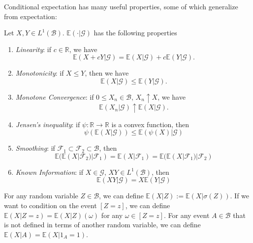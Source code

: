 Conditional expectation has many useful properties, some of which generalize from expectation:
\begin{proposition}
    \label{cexpe_properties}
    Let \(X, Y \in L^{1}(\mathcal{B})\). \(\mathbb{E}(\cdot|{\mathcal{G}})\) has the following properties
    \begin{enumerate}
        \item \textit{Linearity}: if \(c \in \mathbb{R}\), we have \[\mathbb{E}(X + cY|{\mathcal{G}}) = \mathbb{E}(X|{\mathcal{G}}) + c\mathbb{E}(Y|{\mathcal{G}}).\]
        \item \textit{Monotonicity}: if \(X \leq Y\), then we have \[\mathbb{E}(X|{\mathcal{G}}) \leq \mathbb{E}(Y|{\mathcal{G}}).\]
        \item \textit{Monotone Convergence}: if \(0 \leq X_{n} \in \mathcal{B}\), \(X_{n} \uparrow X\), we have \[\mathbb{E}(X_{n}|{\mathcal{G}}) \uparrow \mathbb{E}(X|{\mathcal{G}}).\]
        \item \textit{Jensen's inequality}: if \(\psi: \mathbb{R} \to \mathbb{R}\) is a convex function, then \[\psi(\mathbb{E}(X|{\mathcal{G}})) \leq \mathbb{E}(\psi(X)|{\mathcal{G}})\]
        \item \textit{Smoothing}: if \(\mathcal{F}_{1} \subset \mathcal{F}_{2} \subset \mathcal{B}\), then \[\mathbb{E}(\mathbb{E}(X|{\mathcal{F}_{2}})|\mathcal{F}_{1}) = \mathbb{E}(X|{\mathcal{F}_{1}}) = \mathbb{E}(\mathbb{E}(X|{\mathcal{F}_{1}})|\mathcal{F}_{2})\]
        \item \textit{Known Information}: if \(X \in \mathcal{G}\), \(XY \in L^{1}(\mathcal{B})\), then \[\mathbb{E}(XY|{\mathcal{G}}) = X\mathbb{E}(Y|{\mathcal{G}})\]
    \end{enumerate}
\end{proposition}

For any random variable \(Z \in \mathcal{B}\), we can define \(\mathbb{E}(X|Z) := \mathbb{E}(X|\sigma(Z))\). If we want to condition on the event \([Z=z]\), we can define \(\mathbb{E}(X|Z=z) = \mathbb{E}(X|Z)(\omega)\) for any \(\omega \in [Z=z]\). For any event \(A \in \mathcal{B}\) that is not defined in terms of another random variable, we can define \(\mathbb{E}(X|A) = \mathbb{E}(X|1_{A} = 1)\).